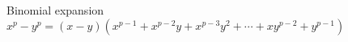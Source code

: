 \documentclass[10pt,landscape]{article}
\makeatletter
\renewcommand{\section}{\@startsection{section}{1}{0mm}%
                                {-1ex plus -.5ex minus -.2ex}%
                                {0.5ex plus .2ex}%
                                {\normalfont\large\bfseries}}
\theoremstyle{definition}
\newcommand{\thistheoremname}{}
\newtheorem*{genericthm*}{\thistheoremname}
\newenvironment{namedthm*}[1]
{\renewcommand{\thistheoremname}{#1}\begin{genericthm*}}
{\end{genericthm*}}
\makeatother
\begin{document}
\begin{multicols}{3}
	\begin{namedthm*}{Binomial expansion}
		\(x^{p}-y^{p}=(x-y)\left(x^{p-1}+x^{p-2} y+x^{p-3} y^{2}+\cdots+x y^{p-2}+y^{p-1}\right)\)
	\end{namedthm*}


\end{multicols}
\end{document}

